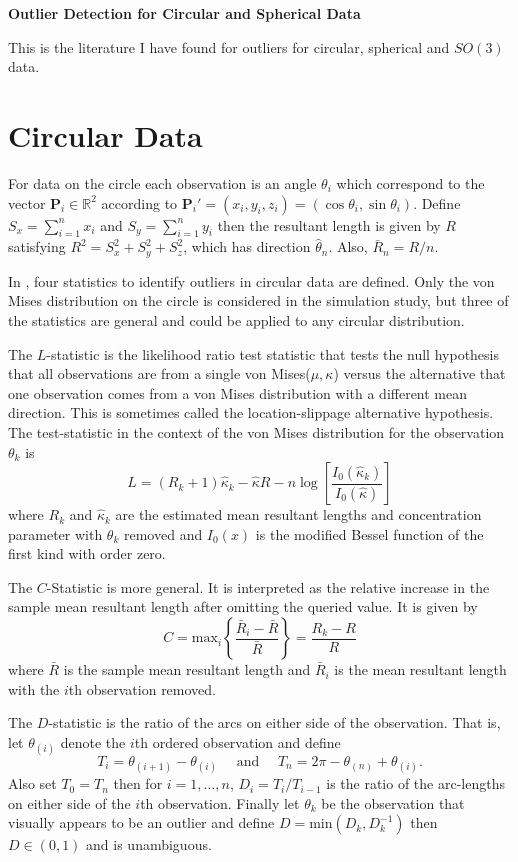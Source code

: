 \documentclass{article}\usepackage[]{graphicx}\usepackage[]{color}
\newcommand{\R}{{\mathbb{R}}}
\begin{document}
\begin{center}
\Large{\bf Outlier Detection for Circular and Spherical Data}
\end{center}
\normalsize
This is the literature I have found for outliers for circular, spherical and $SO(3)$ data.

\section{Circular Data}\label{sec:circle}

For data on the circle each observation is an angle $\theta_i$ which correspond to the vector $\bm P_i\in \R^2$ according to $\bm P_i'=(x_i,y_i,z_i)=(\cos\theta_i,\sin\theta_i)$.  Define $S_x=\sum_{i=1}^nx_i$ and $S_y=\sum_{i=1}^ny_i$ then the resultant length is given by $R$ satisfying $R^2=S_x^2+S_y^2+S_z^2$, which has direction $\hat\theta_n$.  Also, $\bar{R}_n=R/n$.

In \cite{collett1980}, four statistics to identify outliers in circular data are defined.  Only the von Mises distribution on the circle is considered in the simulation study, but three of the statistics are general and could be applied to any circular distribution. 

The $L$-statistic is the likelihood ratio test statistic that tests the null hypothesis that all observations are from a single von Mises($\mu,\kappa$) versus the alternative that one observation comes from a von Mises distribution with a different mean direction.  This is sometimes called the location-slippage alternative hypothesis.  The test-statistic in the context of the von Mises distribution for the observation $\theta_k$ is
\[
L=(R_k+1)\hat{\kappa}_k-\hat{\kappa}R-n\log\left[\frac{I_0(\hat{\kappa}_k)}{I_0(\hat{\kappa})}\right]
\]
where $R_k$ and $\hat\kappa_k$ are the estimated mean resultant lengths and concentration parameter with $\theta_k$ removed and $I_0(x)$ is the modified Bessel function of the first kind with order zero.

The $C$-Statistic is more general.  It is interpreted as the relative increase in the sample mean resultant length after omitting the queried value.  It is given by
\[
C=\text{max}_i\left\{\frac{\bar{R}_i-\bar{R}}{\bar{R}}\right\}=\frac{R_k-R}{R}
\]
where $\bar{R}$ is the sample mean resultant length and $\bar{R}_i$ is the mean resultant length with the $i$th observation removed.  

The $D$-statistic is the ratio of the arcs on either side of the observation.  That is, let $\theta_{(i)}$ denote the $i$th ordered observation and define
\[
T_i=\theta_{(i+1)}-\theta_{(i)}\hspace{1em}\text{ and }\hspace{1em}T_n=2\pi-\theta_{(n)}+\theta_{(i)}.
\]
 Also set $T_{0}=T_{n}$ then for $i=1,\dots,n$, $D_i=T_i/T_{i-1}$ is the ratio of the arc-lengths on either side of the $i$th observation.  Finally let $\theta_k$ be the observation that visually appears to be an outlier and define $D=\text{min}(D_k,D_{k}^{-1})$ then $D\in(0,1)$ and is unambiguous.
\end{document}
